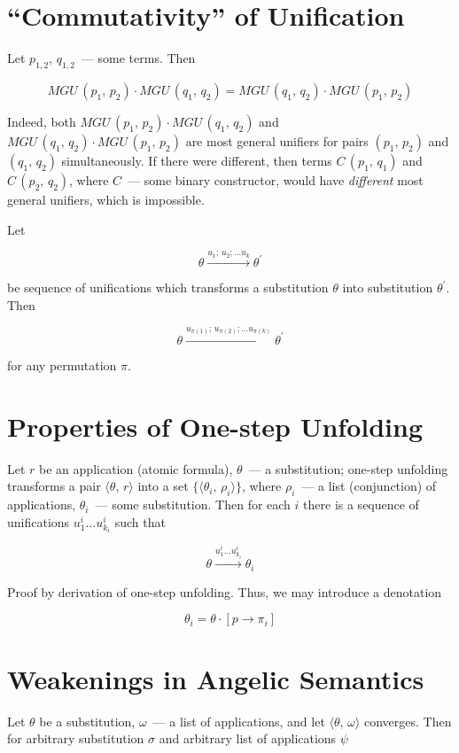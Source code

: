 \documentclass{article}[12pt]
\newcommand{\inbr}[1]{\langle #1 \rangle}
\begin{document}
\section{``Commutativity'' of Unification}

Let $p_{1,2},\,q_{1,2}$~--- some terms. Then

\[
MGU\,(p_1,\,p_2)\cdot MGU\,(q_1,\,q_2)=MGU\,(q_1,\,q_2)\cdot MGU\,(p_1,\,p_2)
\]

Indeed, both $MGU\,(p_1,\,p_2)\cdot MGU\,(q_1,\,q_2)$ and $MGU\,(q_1,\,q_2)\cdot MGU\,(p_1,\,p_2)$ are most general unifiers
for pairs $(p_1,\,p_2)$ and $(q_1,\,q_2)$ simultaneously. If there were different, then terms $C\,(p_1,\,q_1)$ and
$C\,(p_2,\,q_2)$, where $C$~--- some binary constructor, would have \emph{different} most general unifiers, which is impossible.

Let

\[
\theta\xrightarrow{u_1;\,u_2;\dots u_k}{\theta^\prime}
\]

be sequence of unifications which transforms a substitution $\theta$ into substitution $\theta^\prime$. Then

\[
\theta\xrightarrow{u_{\pi(1)};\,u_{\pi(2)};\dots u_{\pi(k)}}{\theta^\prime}
\]

for any permutation $\pi$.

\section{Properties of One-step Unfolding}

Let $r$ be an application (atomic formula), $\theta$~--- a substitution; one-step unfolding transforms a pair $\inbr{\theta,\,r}$ into
a set $\{\inbr{\theta_i,\,\rho_i}\}$, where $\rho_i$~--- a list (conjunction) of applications, $\theta_i$~--- some substitution. Then
for each $i$ there is a sequence of unifications $u^i_1\dots u^i_{k_i}$ such that

\[
\theta\xrightarrow{u^i_1\dots u^i_{k_i}}{\theta_i}
\]

Proof by derivation of one-step unfolding. Thus, we may introduce a denotation

\[
\theta_i=\theta\cdot[p\to\pi_i]
\]

\section{Weakenings in Angelic Semantics}

Let $\theta$ be a substitution, $\omega$~--- a list of applications, and let $\inbr{\theta,\,\omega}$ converges. Then for arbitrary substitution $\sigma$ and
arbitrary list of applications $\psi$
\end{document}
